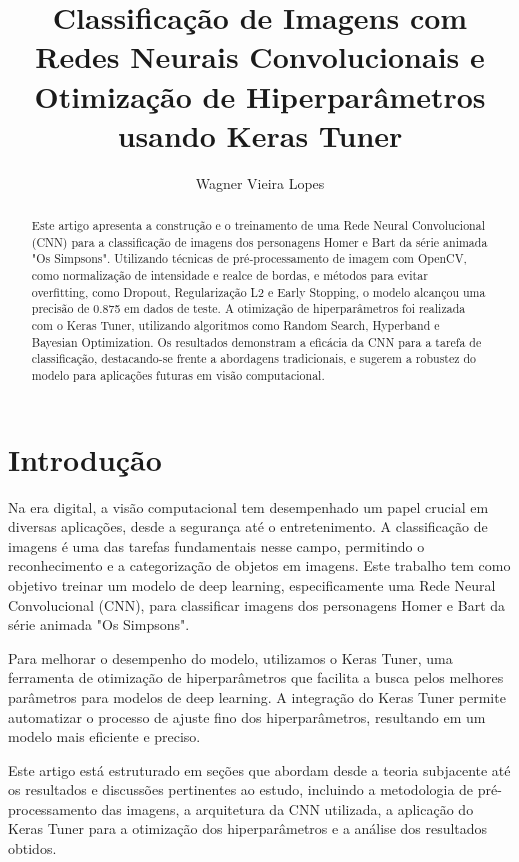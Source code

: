 \documentclass{article}
\title{Classificação de Imagens com Redes Neurais Convolucionais e Otimização de Hiperparâmetros usando Keras Tuner}
\author{Wagner Vieira Lopes}
\begin{document}
\maketitle

\begin{abstract}
Este artigo apresenta a construção e o treinamento de uma Rede Neural Convolucional (CNN) para a classificação de imagens dos personagens Homer e Bart da série animada "Os Simpsons". Utilizando técnicas de pré-processamento de imagem com OpenCV, como normalização de intensidade e realce de bordas, e métodos para evitar overfitting, como Dropout, Regularização L2 e Early Stopping, o modelo alcançou uma precisão de 0.875 em dados de teste. A otimização de hiperparâmetros foi realizada com o Keras Tuner, utilizando algoritmos como Random Search, Hyperband e Bayesian Optimization. Os resultados demonstram a eficácia da CNN para a tarefa de classificação, destacando-se frente a abordagens tradicionais, e sugerem a robustez do modelo para aplicações futuras em visão computacional.
\end{abstract}


\section{Introdução}

Na era digital, a visão computacional tem desempenhado um papel crucial em diversas aplicações, desde a segurança até o entretenimento. A classificação de imagens é uma das tarefas fundamentais nesse campo, permitindo o reconhecimento e a categorização de objetos em imagens. Este trabalho tem como objetivo treinar um modelo de deep learning, especificamente uma Rede Neural Convolucional (CNN), para classificar imagens dos personagens Homer e Bart da série animada "Os Simpsons". 

Para melhorar o desempenho do modelo, utilizamos o Keras Tuner, uma ferramenta de otimização de hiperparâmetros que facilita a busca pelos melhores parâmetros para modelos de deep learning. A integração do Keras Tuner permite automatizar o processo de ajuste fino dos hiperparâmetros, resultando em um modelo mais eficiente e preciso.

Este artigo está estruturado em seções que abordam desde a teoria subjacente até os resultados e discussões pertinentes ao estudo, incluindo a metodologia de pré-processamento das imagens, a arquitetura da CNN utilizada, a aplicação do Keras Tuner para a otimização dos hiperparâmetros e a análise dos resultados obtidos.
\end{document}
